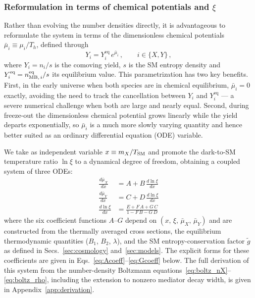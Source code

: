 \documentclass[11pt]{article}
\numberwithin{equation}{section}
\newcommand{\TD}{T_h}
\begin{document}
\subsubsection{Reformulation in terms of chemical potentials and $\xi$}
\label{sec:chempot_formulation}

Rather than evolving the number densities directly, it is advantageous to reformulate the system in terms of the dimensionless chemical potentials $\bar{\mu}_i \equiv \mu_i/\TD$, defined through
\begin{equation}
    Y_i = Y_i^{\text{eq}}\,e^{\bar{\mu}_i}\,, \qquad i \in \{X, Y\}\,,
    \label{eq:chempot_def}
\end{equation}
where $Y_i = n_i/s$ is the comoving yield, $s$ is the SM entropy density and $Y_i^{\text{eq}} = n^{\rm eq}_{{\rm MB},\,i}/s$ its equilibrium value. This parametrization has two key benefits. First, in the early universe when both species are in chemical equilibrium, $\bar{\mu}_i = 0$ exactly, avoiding the need to track the cancellation between $Y_i$ and $Y_i^{\text{eq}}$ --- a severe numerical challenge when both are large and nearly equal. Second, during freeze-out the dimensionless chemical potential grows linearly while the yield departs exponentially, so $\bar{\mu}_i$ is a much more slowly varying quantity and hence better suited as an ordinary differential equation (ODE) variable.

We take as independent variable $x \equiv m_X/T_{\rm SM}$ and promote
the dark-to-SM temperature ratio $\ln\xi$ to a dynamical degree of
freedom, obtaining a coupled system of three ODEs:
\begin{align}
    \frac{d\bar{\mu}_X}{dx} &= A + B\,\frac{d\ln\xi}{dx} \label{eq:dmuX} \\
    \frac{d\bar{\mu}_Y}{dx} &= C + D\,\frac{d\ln\xi}{dx} \label{eq:dmuY} \\
    \frac{d\ln\xi}{dx} &= \frac{E + F\,A + G\,C}{1 - F\,B - G\,D} \label{eq:dlnxi_full}
\end{align}
where the six coefficient functions $A$--$G$ depend on $(x,\,\xi,\,\bar\mu_X,\,
\bar\mu_Y)$ and are constructed from the thermally averaged cross
sections, the equilibrium thermodynamic quantities ($B_1$, $B_2$,
$\lambda$), and the SM entropy-conservation factor $\tilde g$ as defined in Secs.~\ref{sec:cosmology} and~\ref{sec:models}. The
explicit forms for these coefficients are given in Eqs.~\eqref{eq:Acoeff}--\eqref{eq:Gcoeff}
below. The full derivation of this system from the number-density Boltzmann equations~\eqref{eq:boltz_nX}--\eqref{eq:boltz_rho}, including the extension to nonzero mediator decay width, is given in Appendix~\ref{app:derivation}.
 
\end{document}
